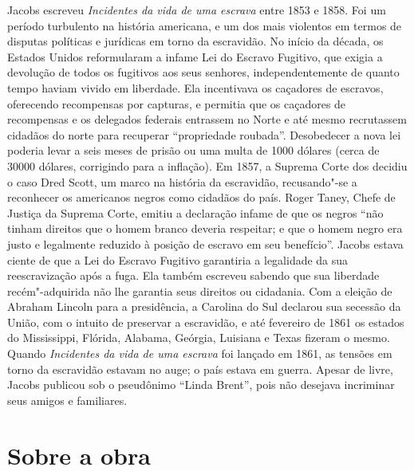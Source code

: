Jacobs escreveu \emph{Incidentes da vida de uma escrava} entre 1853 e
1858. Foi um período turbulento na história americana, e um dos mais
violentos em termos de disputas políticas e jurídicas
em torno da escravidão. No início da década, os Estados Unidos
reformularam a infame Lei do Escravo Fugitivo, que exigia a devolução de todos os
fugitivos aos seus senhores,
independentemente de quanto tempo haviam vivido em liberdade. Ela
incentivava os caçadores de escravos, oferecendo recompensas por
capturas, e permitia que os caçadores de recompensas e os delegados
federais entrassem no Norte e até mesmo recrutassem cidadãos do norte
para recuperar ``propriedade roubada''. Desobedecer a nova lei poderia
levar a seis meses de prisão ou uma multa de 1000 dólares (cerca de
30000 dólares, corrigindo para a inflação). Em 1857, a Suprema Corte
dos  decidiu o caso Dred Scott, um marco na história da escravidão,
recusando"-se a reconhecer os americanos negros como cidadãos do país.
Roger Taney, Chefe de Justiça da Suprema Corte, emitiu a declaração
infame de que os negros ``não tinham direitos que o homem branco deveria
respeitar; e que o homem negro era justo e legalmente reduzido à posição
de escravo em seu benefício''. Jacobs estava ciente de que a Lei do
Escravo Fugitivo garantiria a legalidade da sua reescravização após a
fuga. Ela também escreveu sabendo que sua liberdade recém"-adquirida não
lhe garantia seus direitos ou cidadania. Com a eleição de Abraham
Lincoln para a presidência, a Carolina do Sul declarou sua secessão da
União, com o intuito de preservar a escravidão, e até fevereiro de 1861
os estados do Mississippi, Flórida, Alabama, Geórgia, Luisiana e Texas
fizeram o mesmo. Quando \emph{Incidentes da vida de uma escrava} foi
lançado em 1861, as tensões em torno da escravidão estavam no auge; o
país estava em guerra. Apesar de livre, Jacobs publicou sob o pseudônimo
``Linda Brent'', pois não desejava incriminar seus amigos e familiares.

\section{Sobre a obra}

